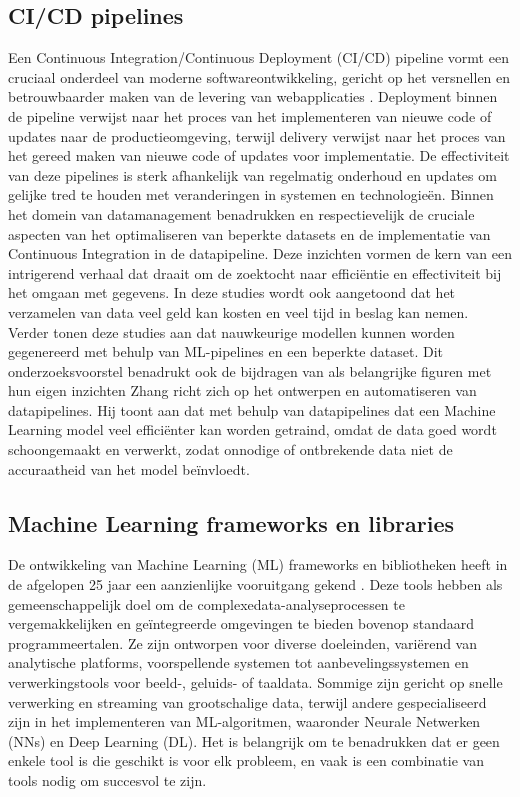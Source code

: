 \subsection{CI/CD pipelines}
Een Continuous Integration/Continuous Deployment (CI/CD) pipeline vormt een cruciaal onderdeel van moderne softwareontwikkeling, gericht op het versnellen en betrouwbaarder maken van de levering van webapplicaties \autocite{Singh2023}. Deployment binnen de pipeline verwijst naar het proces van het implementeren van nieuwe code of updates naar de productieomgeving, terwijl delivery verwijst naar het proces van het gereed maken van nieuwe code of updates voor implementatie. De effectiviteit van deze pipelines is sterk afhankelijk van regelmatig onderhoud en updates om gelijke tred te houden met veranderingen in systemen en technologieën. Binnen het domein van datamanagement benadrukken \textcite{Samad2018} en \textcite{Vadavalasa2020} respectievelijk de cruciale aspecten van het optimaliseren van beperkte datasets en de implementatie van Continuous Integration in de datapipeline. Deze inzichten vormen de kern van een intrigerend verhaal dat draait om de zoektocht naar efficiëntie en effectiviteit bij het omgaan met gegevens. In deze studies wordt ook aangetoond dat het verzamelen van data veel geld kan kosten en veel tijd in beslag kan nemen. Verder tonen deze studies aan dat nauwkeurige modellen kunnen worden gegenereerd met behulp van ML-pipelines en een beperkte dataset. Dit onderzoeksvoorstel benadrukt ook de bijdragen van \textcite{Zhang2022} als belangrijke figuren met hun eigen inzichten
Zhang richt zich op het ontwerpen en automatiseren van datapipelines. Hij toont aan dat met behulp van datapipelines dat een Machine Learning model veel efficiënter kan worden getraind, omdat de data goed wordt schoongemaakt en verwerkt, zodat onnodige of ontbrekende data niet de accuraatheid van het model beïnvloedt.
\subsection{Machine Learning frameworks en libraries}
De ontwikkeling van Machine Learning (ML) frameworks en bibliotheken heeft in de afgelopen 25 jaar een aanzienlijke vooruitgang gekend \autocite{Nguyen2019}. Deze tools hebben als gemeenschappelijk doel om de complexe\newline data-analyseprocessen te vergemakkelijken en geïntegreerde omgevingen te bieden bovenop standaard programmeertalen. Ze zijn ontworpen voor diverse doeleinden, variërend van analytische platforms, voorspellende systemen tot aanbevelingssystemen en verwerkingstools voor beeld-, geluids- of taaldata. Sommige zijn gericht op snelle verwerking en streaming van grootschalige data, terwijl andere gespecialiseerd zijn in het implementeren van ML-algoritmen, waaronder Neurale Netwerken (NNs) en Deep Learning (DL). Het is belangrijk om te benadrukken dat er geen enkele tool is die geschikt is voor elk probleem, en vaak is een combinatie van tools nodig om succesvol te zijn.

